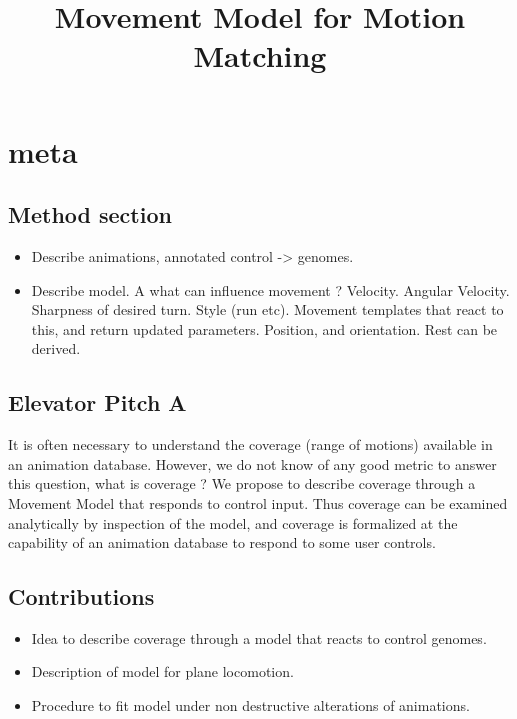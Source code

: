 \documentclass[format=acmtog]{acmart}
\begin{document}
\title{Movement Model for Motion Matching}









\maketitle

\section{meta}
\subsection{Method section}
\begin{itemize}
    \item Describe animations, annotated control -> genomes.
    \item Describe model. A what can influence movement ? Velocity. Angular Velocity. Sharpness of desired turn. Style (run etc). Movement templates that react to this, and return updated parameters. Position, and orientation. Rest can be derived.
\end{itemize}

\subsection{Elevator Pitch A}
\clearpage
It is often necessary to understand the coverage (range of motions) available in an animation database. However, we do not know of any good metric to answer this question, what is coverage ? We propose to describe coverage through a Movement Model that responds to control input. Thus coverage can be examined analytically by inspection of the model, and coverage is formalized at the capability of an animation database to respond to some user controls.

\subsection{Contributions}
\begin{itemize}
    \item Idea to describe coverage through a model that reacts to control genomes.
    \item Description of model for plane locomotion.
    \item Procedure to fit model under non destructive alterations of animations.
\end{itemize}
\end{document}
